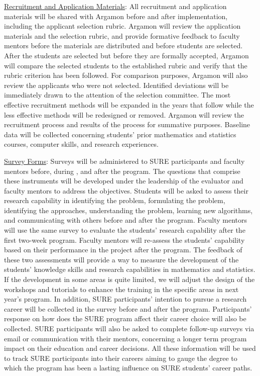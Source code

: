 \documentclass[11pt]{NSFamsart}
\newcommand{\Upara}[1]{\noindent\underline{\upshape #1}:}
\begin{document}
\Upara{Recruitment and Application Materials} 
All recruitment and application materials will be shared
with Argamon before and after implementation, including the applicant selection rubric. Argamon will review
the application materials and the selection rubric, and provide formative feedback to faculty mentors
before the materials are distributed and before students are selected. After the students are selected
but before they are formally accepted, Argamon will compare the selected students to the established
rubric and verify that the rubric criterion has been followed. For comparison purposes, Argamon will also
review the applicants who were not selected. Identified deviations will be immediately drawn to the
attention of the selection committee. The most effective recruitment methods will be expanded in the
years that follow while the less effective methods will be redesigned or removed. Argamon will review the
recruitment process and results of the process for summative purposes. Baseline data will be collected
concerning students’ prior mathematics and statistics courses, computer skills, and research experiences.


\Upara{Survey Forms} 
Surveys will be administered to SURE participants and faculty mentors before, during
, and after the program. The questions that comprise these instruments will be developed under the leadership of the evaluator and faculty mentors to address the objectives.
Students will be asked to assess their research capability in identifying the problem, formulating the problem, identifying the approaches, understanding the problem, learning new algorithms, and communicating with others before and after the program.
Faculty mentors will use the same survey to evaluate the students' research capability after the first two-week program. Faculty mentors will re-assess the students' capability based on their performance in the project after the program.
The feedback of these two assessments will provide a way to measure the development of the students' knowledge skills and research capabilities in mathematics and statistics. If the development in some areas is quite limited, we will adjust the design of the workshops and tutorials to enhance the training in the specific areas in next year's program.
In addition, SURE participants' intention to pursue a research career will be collected in the survey before and after the program. Participants' response on how does the SURE program affect their career choice will also be collected. 
SURE participants will also be asked to complete follow-up surveys via email or communication with their mentors, concerning a longer term program impact on their education and
career decisions. All these information will be used to track SURE participants into their careers aiming
to gauge the degree to which the program has been a lasting influence on SURE students’ career paths.
\end{document}
